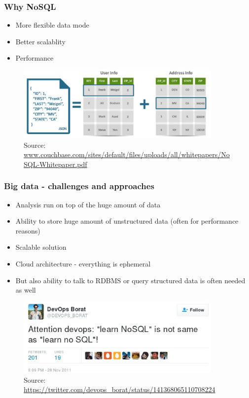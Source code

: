 \documentclass[10pt,utf8]{beamer}
\begin{document}
\begin{frame}
	\frametitle{Why NoSQL}
	\begin{itemize}
	 \item More flexible data mode
	 \item Better scalablity
	 \item Performance
	\end{itemize}
	\begin{figure}
		\centering
		\includegraphics[width=10cm]{./img/json_vs_sql.eps}
		\caption{\tiny{Source: \url{www.couchbase.com/sites/default/files/uploads/all/whitepapers/NoSQL-Whitepaper.pdf}}}
	\end{figure}
\end{frame}


\begin{frame}
	\frametitle{Big data - challenges and approaches}
	 {
		\begin{itemize}
			\item Analysis run on top of the huge amount of data
			\item Ability to store huge amount of unstructured data (often for performance reasons)
			\item Scalable solution
			\item Cloud architecture - everything is ephemeral
			\item But also ability  to talk to RDBMS or query structured data is often needed as well
		\end{itemize}
	}
	 {
		\begin{figure}
			\centering
			\includegraphics[width=10cm]{./img/borat_learn_nosql.eps}
			\caption{\tiny{Source: \url{https://twitter.com/devops_borat/status/141368065110708224}}}
		\end{figure}
	}
\end{frame}
\end{document}
